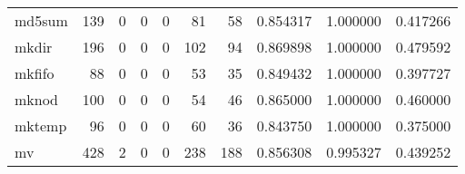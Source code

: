 \begin{longtable}{lrrrrrrrrr}
md5sum    &                                   139 &                                                  0 &                                                  0 &                                                  0 &                                                 81 &                                                 58 &                                           0.854317 &                               1.000000 &                             0.417266 \\
mkdir     &                                   196 &                                                  0 &                                                  0 &                                                  0 &                                                102 &                                                 94 &                                           0.869898 &                               1.000000 &                             0.479592 \\
mkfifo    &                                    88 &                                                  0 &                                                  0 &                                                  0 &                                                 53 &                                                 35 &                                           0.849432 &                               1.000000 &                             0.397727 \\
mknod     &                                   100 &                                                  0 &                                                  0 &                                                  0 &                                                 54 &                                                 46 &                                           0.865000 &                               1.000000 &                             0.460000 \\
mktemp    &                                    96 &                                                  0 &                                                  0 &                                                  0 &                                                 60 &                                                 36 &                                           0.843750 &                               1.000000 &                             0.375000 \\
mv        &                                   428 &                                                  2 &                                                  0 &                                                  0 &                                                238 &                                                188 &                                           0.856308 &                               0.995327 &                             0.439252 \\

\end{longtable}
